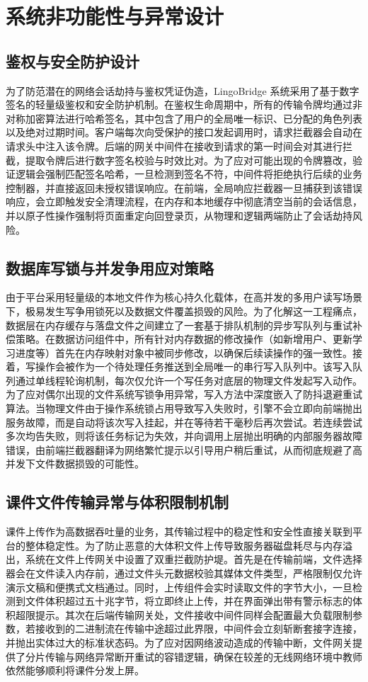 \chapter{系统非功能性与异常设计}

\section{鉴权与安全防护设计}
为了防范潜在的网络会话劫持与鉴权凭证伪造，LingoBridge 系统采用了基于数字签名的轻量级鉴权和安全防护机制。在鉴权生命周期中，所有的传输令牌均通过非对称加密算法进行哈希签名，其中包含了用户的全局唯一标识、已分配的角色列表以及绝对过期时间。客户端每次向受保护的接口发起调用时，请求拦截器会自动在请求头中注入该令牌。后端的网关中间件在接收到请求的第一时间会对其进行拦截，提取令牌后进行数字签名校验与时效比对。为了应对可能出现的令牌篡改，验证逻辑会强制匹配签名哈希，一旦检测到签名不符，中间件将拒绝执行后续的业务控制器，并直接返回未授权错误响应。在前端，全局响应拦截器一旦捕获到该错误响应，会立即触发安全清理流程，在内存和本地缓存中彻底清空当前的会话信息，并以原子性操作强制将页面重定向回登录页，从物理和逻辑两端防止了会话劫持风险。

\section{数据库写锁与并发争用应对策略}
由于平台采用轻量级的本地文件作为核心持久化载体，在高并发的多用户读写场景下，极易发生写争用锁死以及数据文件覆盖损毁的风险。为了化解这一工程痛点，数据层在内存缓存与落盘文件之间建立了一套基于排队机制的异步写队列与重试补偿策略。在数据访问组件中，所有针对内存数据的修改操作（如新增用户、更新学习进度等）首先在内存映射对象中被同步修改，以确保后续读操作的强一致性。接着，写操作会被作为一个待处理任务推送到全局唯一的串行写入队列中。该写入队列通过单线程轮询机制，每次仅允许一个写任务对底层的物理文件发起写入动作。为了应对偶尔出现的文件系统写锁争用异常，写入方法中深度嵌入了防抖退避重试算法。当物理文件由于操作系统锁占用导致写入失败时，引擎不会立即向前端抛出服务故障，而是自动将该次写入挂起，并在等待若干毫秒后再次尝试。若连续尝试多次均告失败，则将该任务标记为失效，并向调用上层抛出明确的内部服务器故障错误，由前端拦截器翻译为网络繁忙提示以引导用户稍后重试，从而彻底规避了高并发下文件数据损毁的可能性。

\section{课件文件传输异常与体积限制机制}
课件上传作为高数据吞吐量的业务，其传输过程中的稳定性和安全性直接关联到平台的整体稳定性。为了防止恶意的大体积文件上传导致服务器磁盘耗尽与内存溢出，系统在文件上传网关中设置了双重拦截防护堤。首先是在传输前端，文件选择器会在文件读入内存前，通过文件头元数据校验其媒体文件类型，严格限制仅允许演示文稿和便携式文档通过。同时，上传组件会实时读取文件的字节大小，一旦检测到文件体积超过五十兆字节，将立即终止上传，并在界面弹出带有警示标志的体积超限提示。其次在后端传输网关处，文件接收中间件同样会配置最大负载限制参数，若接收到的二进制流在传输中途超过此界限，中间件会立刻斩断套接字连接，并抛出实体过大的标准状态码。为了应对因网络波动造成的传输中断，文件网关提供了分片传输与网络异常断开重试的容错逻辑，确保在较差的无线网络环境中教师依然能够顺利将课件分发上屏。

